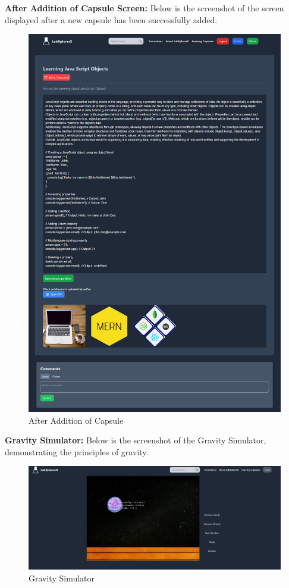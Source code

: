 \textbf{After Addition of Capsule Screen:} Below is the screenshot of the screen displayed after a new capsule has been successfully added.
\begin{figure}[H]
    \centering
    \includegraphics[width = 14cm]{Diagrams/output/after_addition.png}
    \caption{After Addition of Capsule}
\end{figure}

\textbf{Gravity Simulator:} Below is the screenshot of the Gravity Simulator, demonstrating the principles of gravity.
\begin{figure}[H]
    \centering
    \includegraphics[width = 16cm]{Diagrams/output/gravity.png}
    \caption{Gravity Simulator}
\end{figure}

